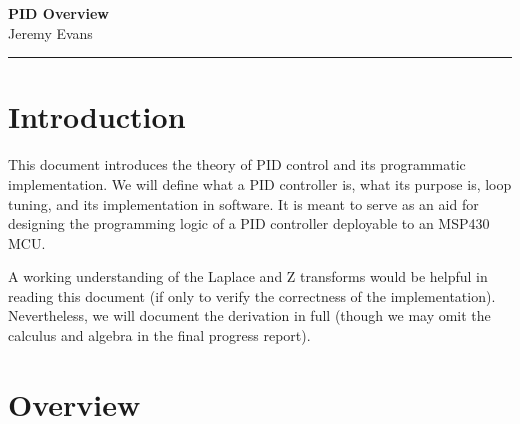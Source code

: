 \documentclass[11pt]{article}
\theoremstyle{definition}
\begin{document}
\noindent
\begin{minipage}{1.00\textwidth}
    \begin{flushleft}
        \textbf{\huge PID Overview} \\[1ex]
        \Large Jeremy Evans
    \end{flushleft}
\noindent\rule{\textwidth}{1pt}
\end{minipage}




\section{Introduction}

This document introduces the theory of PID control and its programmatic implementation. We will define
what a PID controller is, what its purpose is, loop tuning, and its implementation in software. It is meant to
serve as an aid for designing the programming logic of a PID controller deployable to an MSP430 MCU.

A working understanding of the Laplace and Z transforms would be helpful in reading this document (if only to 
verify the correctness of the implementation). Nevertheless, we will document the derivation in full (though we may
omit the calculus and algebra in the final progress report).

\section{Overview}
\end{document}
